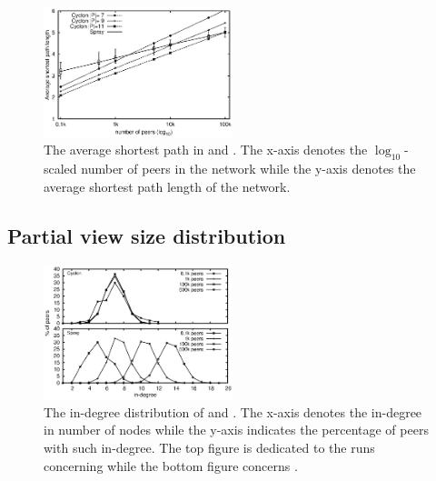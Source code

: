 \begin{figure}
  \centering
  \includegraphics[width=0.49\textwidth]{img/avgpath.eps}
  \caption{\label{fig:avgpath}The average shortest path in \SPRAY and
    \CYCLON. The x-axis denotes the $\log_{10}$-scaled number of peers in the
    network while the y-axis denotes the average shortest path length of the
    network.}
\end{figure}

\subsection{Partial view size distribution}
\label{subsec:dist}

\begin{figure}
  \centering
  \includegraphics[width=0.49\textwidth]{img/histo.eps}
  \caption{\label{fig:histo}The in-degree distribution of \CYCLON and
    \SPRAY. The x-axis denotes the in-degree in number of nodes while the
    y-axis indicates the percentage of peers with such in-degree. The top
    figure is dedicated to the runs concerning \CYCLON while the bottom figure
    concerns \SPRAY.}
\end{figure}

